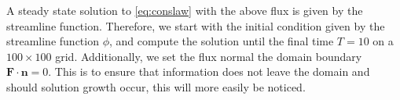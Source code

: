 A steady state solution to \eqref{eq:conslaw} with the above flux is given by the streamline function.  Therefore, we start with the initial condition given by the streamline function $\phi$, and compute the solution until the final time $T = 10$ on a $100 \times 100$ grid.  Additionally, we set the flux normal the domain boundary $\mathbf{F}\cdot \mathbf{n} = 0$.  This is to ensure that information does not leave the domain and should solution growth occur, this will more easily be noticed.



\begin{table}
    \centering
    \quad
{}
    
\caption{Errors for overlapping neighborhoods study.} \label{tab:overlappingerrors}
\end{table}


